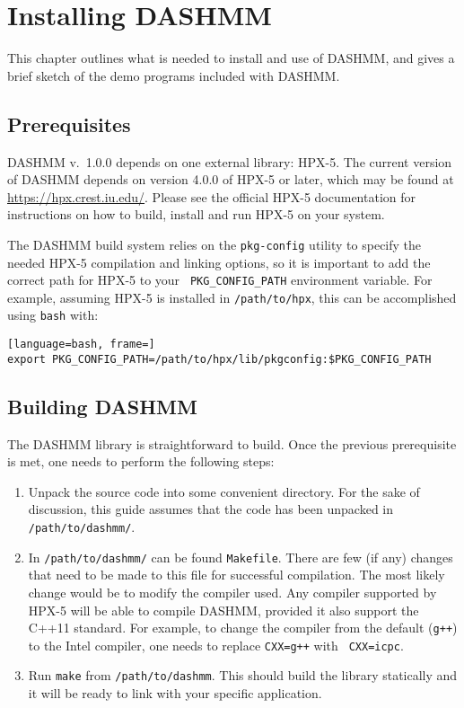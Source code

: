 \chapter{Installing DASHMM}
\label{ch:install}

This chapter outlines what is needed to install and use of DASHMM, and
gives a brief sketch of the demo programs included with DASHMM.

\section{Prerequisites}

DASHMM v.\ 1.0.0 depends on one external library: HPX-5. The current
version of DASHMM depends on version 4.0.0 of HPX-5 or later, which
may be found at \url{https://hpx.crest.iu.edu/}. Please see the
official HPX-5 documentation for instructions on how to build, install
and run HPX-5 on your system.

The DASHMM build system relies on the {\tt pkg-config} utility to
specify the needed HPX-5 compilation and linking options, so it is
important to add the correct path for HPX-5 to your {\tt
  PKG\_CONFIG\_PATH} environment variable. For example, assuming HPX-5
is installed in {\tt /path/to/hpx}, this can be accomplished using
{\tt bash} with:

\begin{lstlisting}[language=bash, frame=]
export PKG_CONFIG_PATH=/path/to/hpx/lib/pkgconfig:$PKG_CONFIG_PATH
\end{lstlisting}

\section{Building DASHMM}

The DASHMM library is straightforward to build. Once the previous
prerequisite is met, one needs to perform the following steps:

\begin{enumerate}
\item Unpack the source code into some convenient directory. For the
  sake of discussion, this guide assumes that the code has been
  unpacked in {\tt /path/to/dashmm/}.
\item In {\tt /path/to/dashmm/} can be found {\tt Makefile}. There are
  few (if any) changes that need to be made to this file for
  successful compilation. The most likely change would be to modify
  the compiler used. Any compiler supported by HPX-5 will be able to
  compile DASHMM, provided it also support the C++11 standard. For
  example, to change the compiler from the default ({\tt g++}) to the
  Intel compiler, one needs to replace {\tt CXX=g++} with {\tt
    CXX=icpc}.
\item Run {\tt make} from {\tt /path/to/dashmm}. This should build the
  library statically and it will be ready to link with your specific
  application.
\end{enumerate}


